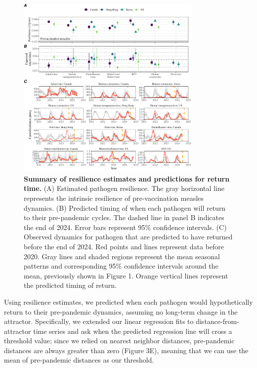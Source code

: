 \documentclass[12pt]{article}
\begin{document}
\begin{figure}[!th]
\begin{center}
\includegraphics[width=0.8\textwidth]{../figure4/figure4.pdf}
\caption{
\textbf{Summary of resilience estimates and predictions for return time.}
(A) Estimated pathogen resilience.
The gray horizontal line represents the intrinsic resilience of pre-vaccination measles dynamics.
(B) Predicted timing of when each pathogen will return to their pre-pandemic cycles.
The dashed line in panel B indicates the end of 2024.
Error bars represent 95\% confidence intervals.
(C) Observed dynamics for pathogen that are predicted to have returned before the end of 2024.
Red points and lines represent data before 2020.
Gray lines and shaded regions represent the mean seasonal patterns and corresponding 95\% confidence intervals around the mean, previously shown in Figure 1.
Orange vertical lines represent the predicted timing of return.
}
\end{center}
\end{figure}

Using resilience estimates, we predicted when each pathogen would hypothetically return to their pre-pandemic dynamics, assuming no long-term change in the attractor.
Specifically, we extended our linear regression fits to distance-from-attractor time series and ask when the predicted regression line will cross a threshold value;
since we relied on nearest neighbor distances, pre-pandemic distances are always greater than zero (Figure 3E), meaning that we can use the mean of pre-pandemic distances as our threshold.
\end{document}
